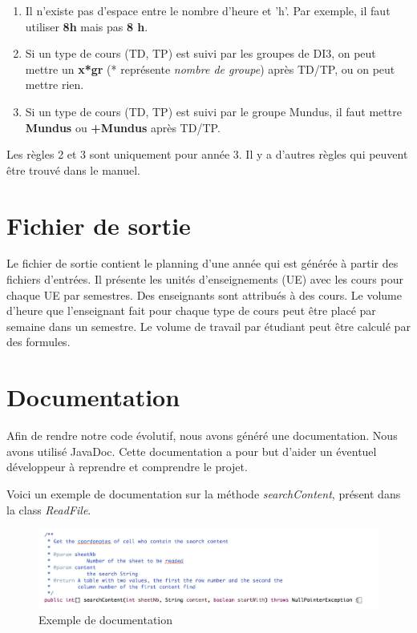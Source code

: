 \documentclass{polytech/polytech}
\begin{document}
	\begin{enumerate}
		\item Il n'existe pas d'espace entre le nombre d'heure et 'h'. Par exemple, il faut utiliser \textbf{8h} mais pas \textbf{8 h}.

		\item Si un type de cours (TD, TP) est suivi par les groupes de DI3, on peut mettre un \textbf{x*gr} (* représente \textit{nombre de groupe}) après
		TD/TP, ou on peut mettre rien.

		\item Si un type de cours (TD, TP) est suivi par le groupe Mundus, il faut mettre \textbf{Mundus} ou \textbf{+Mundus} après TD/TP.

	\end{enumerate}

	Les règles 2 et 3 sont uniquement pour année 3.
	Il y a d'autres règles qui peuvent être trouvé dans le manuel.

	\section{Fichier de sortie}

	Le fichier de sortie contient le planning d'une année qui est générée à partir des fichiers d'entrées.
	Il présente les unités d'enseignements (UE) avec les cours pour chaque UE par semestres.
	Des enseignants sont attribués à des cours. Le volume d'heure que l'enseignant fait pour chaque type de cours peut être placé par semaine dans un semestre.
	Le volume de travail par étudiant peut être calculé par des formules.

	\section{Documentation}
	Afin de rendre notre code évolutif, nous avons généré une documentation.
	Nous avons utilisé JavaDoc.
	Cette documentation a pour but d'aider un éventuel développeur à reprendre et comprendre le projet.

	Voici un exemple de documentation sur la méthode \textit{searchContent}, présent dans la class \textit{ReadFile}.

	\begin{figure}
		\caption{Exemple de documentation}
		\includegraphics[width=\textwidth]{./img/documentation.png}
	\end{figure}
\end{document}
